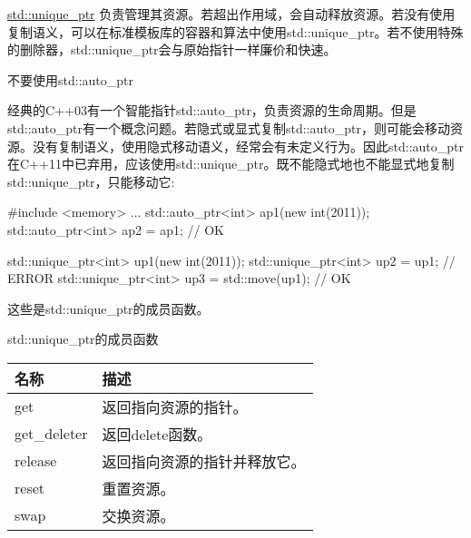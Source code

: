 
\href{http://en.cppreference.com/w/cpp/memory/unique_ptr}{std::unique\_ptr} 负责管理其资源。若超出作用域，会自动释放资源。若没有使用复制语义，可以在标准模板库的容器和算法中使用std::unique\_ptr。若不使用特殊的删除器，std::unique\_ptr会与原始指针一样廉价和快速。

\begin{myWarning}{不要使用std::auto\_ptr}

经典的C++03有一个智能指针std::auto\_ptr，负责资源的生命周期。但是std::auto\_ptr有一个概念问题。若隐式或显式复制std::auto\_ptr，则可能会移动资源。没有复制语义，使用隐式移动语义，经常会有未定义行为。因此std::auto\_ptr在C++11中已弃用，应该使用std::unique\_ptr。既不能隐式地也不能显式地复制std::unique\_ptr，只能移动它:

\begin{cpp}
#include <memory>
...
std::auto_ptr<int> ap1(new int(2011));
std::auto_ptr<int> ap2 = ap1; // OK

std::unique_ptr<int> up1(new int(2011));
std::unique_ptr<int> up2 = up1; // ERROR
std::unique_ptr<int> up3 = std::move(up1); // OK
\end{cpp}

\end{myWarning}

这些是std::unique\_ptr的成员函数。

\begin{center}
std::unique\_ptr的成员函数
\end{center}

\begin{longtable}[c]{|l|l|}
\hline
名称         & 描述                                       \\ \hline
\endfirsthead
%
\endhead
%
get          & 返回指向资源的指针。                 \\ \hline
get\_deleter & 返回delete函数。                      \\ \hline
release      & 返回指向资源的指针并释放它。 \\ \hline
reset        & 重置资源。                              \\ \hline
swap         & 交换资源。                                \\ \hline
\end{longtable}

